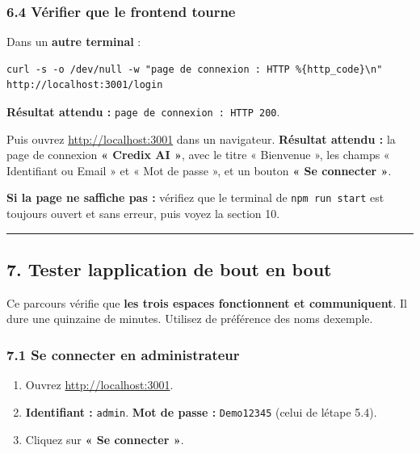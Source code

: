 \documentclass[
  french,
  11pt,
  a4paper,
]{article}
\providecommand{\tightlist}{%
  \setlength{\itemsep}{0pt}\setlength{\parskip}{0pt}}
\begin{document}
\subsubsection{6.4 Vérifier que le frontend
tourne}\label{64-vuxe9rifier-que-le-frontend-tourne}

Dans un \textbf{autre terminal} :

\begin{Verbatim}[breaklines=true,breakanywhere=true,fontsize=\small,frame=leftline,framerule=1.6pt,rulecolor=\color{credixblue},framesep=3mm,xleftmargin=2mm,xrightmargin=1mm]
curl -s -o /dev/null -w "page de connexion : HTTP %{http_code}\n" http://localhost:3001/login
\end{Verbatim}

\textbf{Résultat attendu :} \texttt{page\ de\ connexion\ :\ HTTP\ 200}.

Puis ouvrez \url{http://localhost:3001} dans un navigateur.
\textbf{Résultat attendu :} la page de connexion \textbf{« Credix AI »},
avec le titre « Bienvenue », les champs « Identifiant ou Email » et «
Mot de passe », et un bouton \textbf{« Se connecter »}.

\textbf{Si la page ne s\textquotesingle affiche pas :} vérifiez que le
terminal de \texttt{npm\ run\ start} est toujours ouvert et sans erreur,
puis voyez la section 10.

\begin{center}\rule{0.5\linewidth}{0.5pt}\end{center}

\subsection{7. Tester l\textquotesingle application de bout en
bout}\label{7-tester-lapplication-de-bout-en-bout}

Ce parcours vérifie que \textbf{les trois espaces fonctionnent et
communiquent}. Il dure une quinzaine de minutes. Utilisez de préférence
des noms d\textquotesingle exemple.

\subsubsection{7.1 Se connecter en
administrateur}\label{71-se-connecter-en-administrateur}

\begin{enumerate}
\def\labelenumi{\arabic{enumi}.}
\tightlist
\item
  Ouvrez \url{http://localhost:3001}.
\item
  \textbf{Identifiant :} \texttt{admin}. \textbf{Mot de passe :}
  \texttt{Demo12345} (celui de l\textquotesingle étape 5.4).
\item
  Cliquez sur \textbf{« Se connecter »}.
\end{enumerate}
\end{document}
